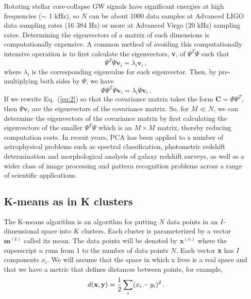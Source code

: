 \documentclass[fleqn,usenatbib]{mnras}
\begin{document}
Rotating stellar core-collapse GW signals have significant energies at high frequencies ($\sim$ 1 kHz), so $N$ can be about 1000 data samples at Advanced LIGO  data sampling rates (16 384 Hz) or more at Advanced Virgo (20 kHz) sampling rates. Determining the eigenvectors of a matrix of such dimensions is computationally expensive. A common method of avoiding this computationally intensive operation is to first calculate the eigenvectors, \textbf{v}, of $\Psi^T\Psi$ such that
\begin{equation}\label{eq:3}
\Psi^T\Psi \textbf{v}_i= \lambda_i\textbf{v}_i\,, 
\end{equation}
where $\lambda_i$ is the corresponding eigenvalue for each eigenvector. Then, by pre-multiplying both
sides by $\Psi$, we have
\begin{equation}\label{eq:4}
\Psi\Psi^T\Psi \textbf{v}_i= \lambda_i\Psi\textbf{v}_i\,. 
\end{equation}
If we rewrite Eq.~(\ref{eq:2}) so that the covariance matrix takes the form $\textbf{C} =\Psi \Psi^T$, then $\Psi\textbf{v}_i$ are the eigenvectors of the covariance matrix. So, for $M \ll N$, we can determine the eigenvectors of the covariance matrix by first calculating the eigenvectors of the smaller $\Psi^T \Psi$ which is an $M \times M$ matrix, thereby reducing computation costs.
In recent years, PCA has been applied to a number of astrophysical problems such as spectral classification, photometric redshift determination and morphological analysis of galaxy redshift surveys, as well as a wider class of image processing and pattern recognition problems across a range of scientific applications. 


\subsection{K-means as in K clusters}

The K-means algorithm is an algorithm for putting $N$ data points in an $I$-dimensional space into $K$ clusters. Each cluster is parameterized by a vector $\textbf{m}^{(k)}$ called its mean. The data points will be denoted by {$\textbf{x}^{(n)}$} where the superscript $n$ runs from 1 to the number of data points $N$. Each vector \textbf{x} has $I$ components $x_i$. We will assume that the space in which x lives  is a real space and that we have a metric that defines distances between points, for example,
\begin{equation}\label{eq:6}
\centering
d(\textbf{x},\textbf{y}) = \frac{1}{2}\sum_{i}(x_i-y_i)^2\,.
\end{equation}
\end{document}

